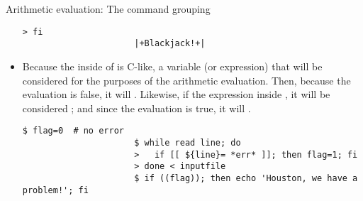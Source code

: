\begin{frame}[fragile]{Arithmetic evaluation: The command grouping \PB{\texttt{((\ldots))}}}
\begin{overlayarea}{\textwidth}{0.7\textheight}
\begin{itemize}
\begin{lstlisting}[style=MyBash, aboveskip=2mm, belowskip=-6mm]
                      > fi
                      |+Blackjack!+|
                  \end{lstlisting}
            \item<only@2> Because the inside of \PB{\texttt{((\ldots))}} is C-like, a variable (or expression) that  will be considered  for the purposes of the arithmetic evaluation.
                  Then, because the evaluation is false, it will .
                  Likewise, if the expression inside \PB{\texttt{((\ldots))}} , it will be considered ; and since the evaluation is true, it will .
                  \begin{lstlisting}[style=MyBash, aboveskip=2mm, belowskip=-6mm]
                      $ flag=0  # no error
                      $ while read line; do
                      >   if [[ ${line}= *err* ]]; then flag=1; fi
                      > done < inputfile
                      $ if ((flag)); then echo 'Houston, we have a problem!'; fi
                  \end{lstlisting}
        \end{itemize}
    \end{overlayarea}
\end{frame}

